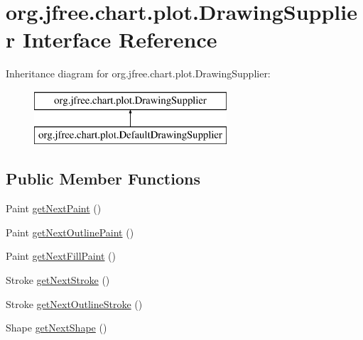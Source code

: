 \hypertarget{interfaceorg_1_1jfree_1_1chart_1_1plot_1_1_drawing_supplier}{}\section{org.\+jfree.\+chart.\+plot.\+Drawing\+Supplier Interface Reference}
\label{interfaceorg_1_1jfree_1_1chart_1_1plot_1_1_drawing_supplier}
Inheritance diagram for org.\+jfree.\+chart.\+plot.\+Drawing\+Supplier\+:\begin{figure}[H]
\begin{center}
\leavevmode
\includegraphics[height=2.000000cm]{interfaceorg_1_1jfree_1_1chart_1_1plot_1_1_drawing_supplier}
\end{center}
\end{figure}
\subsection*{Public Member Functions}
\begin{DoxyCompactItemize}
\item 
Paint \mbox{\hyperlink{interfaceorg_1_1jfree_1_1chart_1_1plot_1_1_drawing_supplier_ad7f6058a6390128ef1e52cddee4f8d0b}{get\+Next\+Paint}} ()
\item 
Paint \mbox{\hyperlink{interfaceorg_1_1jfree_1_1chart_1_1plot_1_1_drawing_supplier_a2b467eb43237810e9ab135ecd3d70017}{get\+Next\+Outline\+Paint}} ()
\item 
Paint \mbox{\hyperlink{interfaceorg_1_1jfree_1_1chart_1_1plot_1_1_drawing_supplier_ad9386ba5a8bd895ba5b4850618324366}{get\+Next\+Fill\+Paint}} ()
\item 
Stroke \mbox{\hyperlink{interfaceorg_1_1jfree_1_1chart_1_1plot_1_1_drawing_supplier_a5e3b2ef52841d31b514d27c954bea536}{get\+Next\+Stroke}} ()
\item 
Stroke \mbox{\hyperlink{interfaceorg_1_1jfree_1_1chart_1_1plot_1_1_drawing_supplier_aa105b3b934971ebb5fea78e30d41f2fb}{get\+Next\+Outline\+Stroke}} ()
\item 
Shape \mbox{\hyperlink{interfaceorg_1_1jfree_1_1chart_1_1plot_1_1_drawing_supplier_a003bd6d202ea37f0e20e8a63b6183525}{get\+Next\+Shape}} ()
\end{DoxyCompactItemize}


